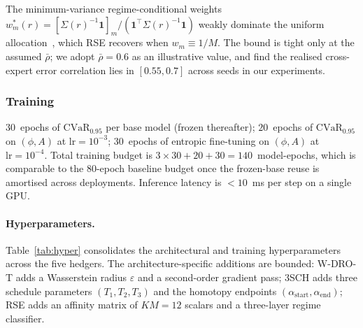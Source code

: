 \documentclass[10pt,letterpaper]{article}
\newcommand{\cvar}{\mathrm{CVaR}}
\begin{document}
The minimum-variance regime-conditional weights
$w_m^*(r) = [\Sigma(r)^{-1}\mathbf{1}]_m /
(\mathbf{1}^\top\Sigma(r)^{-1}\mathbf{1})$ weakly dominate the
uniform allocation~\citep{dietterich2000ensemble}, which RSE
recovers when $w_m\!\equiv\!1/M$. The bound is tight only at the
assumed $\bar\rho$; we adopt $\bar\rho=0.6$ as an illustrative
value, and find the realised cross-expert error correlation lies
in $[0.55,0.7]$ across seeds in our experiments.

\subsubsection*{Training}

$30$~epochs of $\cvar_{0.95}$ per base model (frozen thereafter);
$20$~epochs of $\cvar_{0.95}$ on $(\phi,A)$ at
$\mathrm{lr}=10^{-3}$; $30$~epochs of entropic fine-tuning on
$(\phi,A)$ at $\mathrm{lr}=10^{-4}$. Total training budget is
$3\!\times\!30+20+30=140$~model-epochs, which is comparable to the
$80$-epoch baseline budget once the frozen-base reuse is amortised
across deployments. Inference latency is $<\!10$~ms per step on a
single GPU.

\paragraph{Hyperparameters.}
Table~\ref{tab:hyper} consolidates the architectural and training
hyperparameters across the five hedgers. The architecture-specific
additions are bounded: W-DRO-T adds a Wasserstein radius
$\varepsilon$ and a second-order gradient pass; 3SCH adds three
schedule parameters $(T_1,T_2,T_3)$ and the homotopy endpoints
$(\alpha_{\mathrm{start}},\alpha_{\mathrm{end}})$; RSE adds an
affinity matrix of $KM=12$ scalars and a three-layer regime
classifier.
\end{document}
